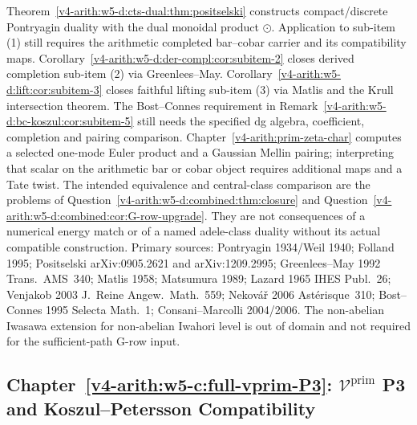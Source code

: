 Theorem~\ref{v4-arith:w5-d:cts-dual:thm:positselski}
constructs compact/discrete Pontryagin duality with the dual monoidal
product \(\odot\). Application to sub-item (1) still requires the
arithmetic completed bar--cobar carrier and its compatibility maps.
Corollary~\ref{v4-arith:w5-d:der-compl:cor:subitem-2}
closes derived completion sub-item (2) via Greenlees--May.
Corollary~\ref{v4-arith:w5-d:lift:cor:subitem-3}
closes faithful lifting sub-item (3) via Matlis and the Krull
intersection theorem.
The Bost--Connes requirement in
Remark~\ref{v4-arith:w5-d:bc-koszul:cor:subitem-5} still needs the specified
dg algebra, coefficient, completion and pairing comparison.
Chapter~\ref{v4-arith:prim-zeta-char} computes a selected one-mode Euler
product and a Gaussian Mellin pairing; interpreting that scalar on the
arithmetic bar or cobar object requires additional maps and a Tate twist.
The intended equivalence and central-class comparison are the problems
of Question~\ref{v4-arith:w5-d:combined:thm:closure} and Question~\ref{v4-arith:w5-d:combined:cor:G-row-upgrade}.
They are not consequences of a numerical energy match or of a named
adele-class duality without its actual compatible construction.
Primary sources: Pontryagin 1934/Weil 1940; Folland 1995;
Positselski arXiv:0905.2621 and arXiv:1209.2995;
Greenlees--May 1992 Trans.~AMS~340; Matlis 1958; Matsumura 1989;
Lazard 1965 IHES Publ.~26; Venjakob 2003 J.~Reine Angew.~Math.~559;
Nekov\'a\v{r} 2006 Ast\'erisque~310; Bost--Connes 1995
Selecta Math.~1; Consani--Marcolli 2004/2006.
The non-abelian Iwasawa extension for non-abelian Iwahori level is
out of domain and not required for the sufficient-path G-row input.

\subsection{Chapter~\ref{v4-arith:w5-c:full-vprim-P3}: \(\mathcal{V}^{\mathrm{prim}}\) P3 and Koszul--Petersson Compatibility}
\label{v4-arith:w5-synth:ch55}

